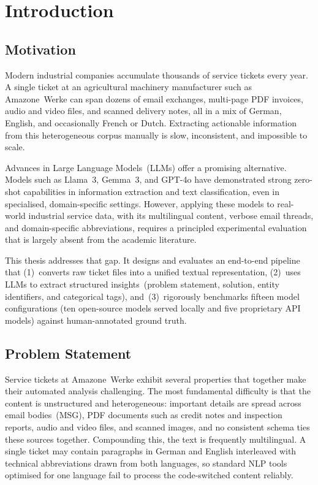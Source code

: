 \chapter{Introduction}
%
\label{chap:Introduction}
%
\section{Motivation}
%
Modern industrial companies accumulate thousands of service tickets every year.
A single ticket at an agricultural machinery manufacturer such as Amazone~Werke
can span dozens of email exchanges, multi-page PDF invoices, audio and video files,
and scanned delivery notes, all in a mix of German, English, and occasionally French
or Dutch. Extracting actionable information from this heterogeneous corpus manually
is slow, inconsistent, and impossible to scale.

Advances in Large Language Models~(LLMs) offer a promising alternative. Models
such as Llama~3, Gemma~3, and GPT-4o have demonstrated strong zero-shot
capabilities in information extraction and text classification, even in specialised,
domain-specific settings. However, applying these models to real-world industrial
service data, with its multilingual content, verbose email threads, and
domain-specific abbreviations, requires a principled experimental evaluation that
is largely absent from the academic literature.

This thesis addresses that gap. It designs and evaluates an end-to-end pipeline that
(1)~converts raw ticket files into a unified textual representation, (2)~uses LLMs
to extract structured insights~(problem statement, solution, entity identifiers, and
categorical tags), and~(3)~rigorously benchmarks fifteen model configurations
(ten open-source models served locally and five proprietary API models) against
human-annotated ground truth.

\section{Problem Statement}
\label{sec:problem}
%
Service tickets at Amazone~Werke exhibit several properties that together make
their automated analysis challenging.  The most fundamental difficulty is that
the content is unstructured and heterogeneous: important details are spread
across email bodies~(MSG), PDF documents such as credit notes and inspection
reports, audio and video files, and scanned images, and no consistent schema ties
these sources together.  Compounding this, the text is frequently
multilingual.  A single ticket may contain paragraphs in German and English
interleaved with technical abbreviations drawn from both languages, so standard
NLP tools optimised for one language fail to process the code-switched content
reliably.

